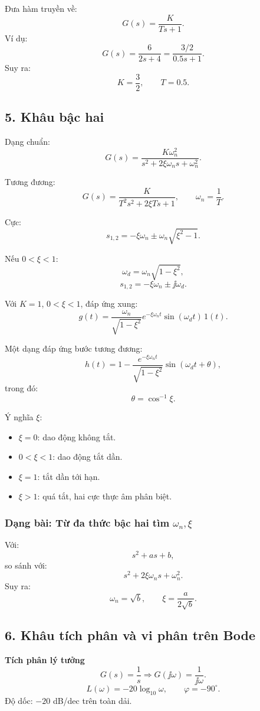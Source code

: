 Đưa hàm truyền về:
\[
G(s)=\frac{K}{Ts+1}.
\]
Ví dụ:
\[
G(s)=\frac{6}{2s+4}
=\frac{3/2}{0.5s+1}.
\]
Suy ra:
\[
\boxed{K=\frac32,\qquad T=0.5}.
\]

\subsection*{5. Khâu bậc hai}

Dạng chuẩn:
\[
\boxed{
G(s)=
\frac{K\omega_n^2}
{s^2+2\xi\omega_ns+\omega_n^2}.
}
\]

Tương đương:
\[
G(s)=\frac{K}{T^2s^2+2\xi Ts+1},
\qquad
\omega_n=\frac1T.
\]

Cực:
\[
s_{1,2}
=
-\xi\omega_n
\pm
\omega_n\sqrt{\xi^2-1}.
\]

Nếu $0<\xi<1$:
\[
\omega_d=\omega_n\sqrt{1-\xi^2},
\]
\[
s_{1,2}=-\xi\omega_n\pm\jj\omega_d.
\]

Với $K=1$, $0<\xi<1$, đáp ứng xung:
\[
\boxed{
g(t)
=
\frac{\omega_n}{\sqrt{1-\xi^2}}
e^{-\xi\omega_nt}
\sin(\omega_dt)\,1(t).
}
\]

Một dạng đáp ứng bước tương đương:
\[
\boxed{
h(t)
=
1-
\frac{e^{-\xi\omega_nt}}{\sqrt{1-\xi^2}}
\sin(\omega_dt+\theta),
}
\]
trong đó:
\[
\theta=\cos^{-1}\xi.
\]

Ý nghĩa $\xi$:
\begin{itemize}[leftmargin=1.7em,itemsep=0.2em]
  \item $\xi=0$: dao động không tắt.
  \item $0<\xi<1$: dao động tắt dần.
  \item $\xi=1$: tắt dần tới hạn.
  \item $\xi>1$: quá tắt, hai cực thực âm phân biệt.
\end{itemize}

\subsubsection*{Dạng bài: Từ đa thức bậc hai tìm $\omega_n,\xi$}

Với:
\[
s^2+as+b,
\]
so sánh với:
\[
s^2+2\xi\omega_ns+\omega_n^2.
\]
Suy ra:
\[
\boxed{
\omega_n=\sqrt b,
\qquad
\xi=\frac{a}{2\sqrt b}.
}
\]

\subsection*{6. Khâu tích phân và vi phân trên Bode}

\textbf{Tích phân lý tưởng}
\[
G(s)=\frac1s
\Longrightarrow
G(\jj\omega)=\frac1{\jj\omega}.
\]
\[
\boxed{
L(\omega)=-20\log_{10}\omega,
\qquad
\varphi=-90^\circ.
}
\]
Độ dốc: $-20$ dB/dec trên toàn dải.

